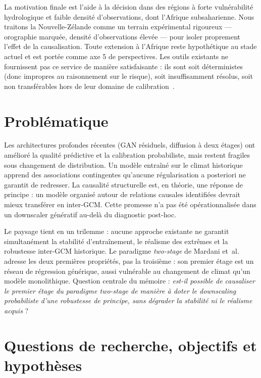 \documentclass[14pt,a4paper,openany]{extreport}
\theoremstyle{definition}
\begin{document}
La motivation finale est l'aide à la décision dans des régions à forte vulnérabilité hydrologique et faible densité d'observations, dont l'Afrique subsaharienne. Nous traitons la Nouvelle-Zélande comme un terrain expérimental rigoureux --- orographie marquée, densité d'observations élevée --- pour isoler proprement l'effet de la causalisation. Toute extension à l'Afrique reste hypothétique au stade actuel et est portée comme axe 5 de perspectives. Les outils existants ne fournissent pas ce service de manière satisfaisante : ils sont soit déterministes (donc impropres au raisonnement sur le risque), soit insuffisamment résolus, soit non transférables hors de leur domaine de calibration~\cite{maraun_widmann_2018}.

\section*{Problématique}

Les architectures profondes récentes (GAN résiduels, diffusion à deux étages) ont amélioré la qualité prédictive et la calibration probabiliste, mais restent fragiles sous changement de distribution. Un modèle entraîné sur le climat historique apprend des associations contingentes qu'aucune régularisation a posteriori ne garantit de redresser. La causalité structurelle est, en théorie, une réponse de principe : un modèle organisé autour de relations causales identifiées devrait mieux transférer en inter-GCM. Cette promesse n'a pas été opérationnalisée dans un downscaler génératif au-delà du diagnostic post-hoc.

Le paysage tient en un trilemme : aucune approche existante ne garantit simultanément la stabilité d'entraînement, le réalisme des extrêmes et la robustesse inter-GCM historique. Le paradigme \emph{two-stage} de Mardani et~al.~\cite{mardani_corrdiff_2023} adresse les deux premières propriétés, pas la troisième : son premier étage est un réseau de régression générique, aussi vulnérable au changement de climat qu'un modèle monolithique. Question centrale du mémoire : \emph{est-il possible de causaliser le premier étage du paradigme two-stage de manière à doter le downscaling probabiliste d'une robustesse de principe, sans dégrader la stabilité ni le réalisme acquis} ?

\section*{Questions de recherche, objectifs et hypothèses}
\end{document}
